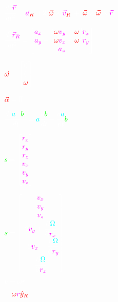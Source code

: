 \documentclass{article}
\begin{document}
\begin{center}
{%
$
\color{white}\cfrac{d^2\color{magenta}\vec{r}}{dt^2}=
\color{magenta}\vec{a}_{\color{red}R}$ $\color{white}+2$ $
\color{red}\vec{\omega}\color{white}\times\color{magenta}\vec{v}_{\color{red}R}$ $\color{white}+$ $
\color{red}\vec{\omega}\color{white}\times\color{red}\vec{\omega}\color{white}\times\color{magenta}\vec{r}
$

$
\color{white}\cfrac{d^2\color{magenta}\vec{r}_R}{dt^2}=
\begin{bmatrix}
	\color{magenta}a_x\color{white}-2\color{red}\omega\color{magenta}v_y\color{white}-\color{red}\omega^{\color{white}2}\color{magenta}r_x \\
	\color{magenta}a_y\color{white}-2\color{red}\omega\color{magenta}v_x\color{white}-\color{red}\omega^{\color{white}2}\color{magenta}r_y \\
	\color{magenta}a_z
\end{bmatrix}
$

$
\color{red}\vec{\omega}\color{white}=
\begin{bmatrix}
	0 \\ 0 \\ \color{red}\omega
\end{bmatrix}
$

$
\color{red}\vec{\alpha}\color{white}=\vec{0}
$


$
\color{white}\cfrac{d(\color{cyan}a\color{white}\cdot\color{green}b\color{white})}{dt}=
\color{cyan}a\color{white}\cfrac{d\color{green}b\color{white}}{dt}+
\cfrac{d\color{cyan}a\color{white}}{dt}\color{green}b
$


$
\color{white}\underline{\color{green}s\color{white}}=
\begin{bmatrix}
	 \color{magenta}r_x \\
	 \color{magenta}r_y \\
	 \color{magenta}r_z \\
	 \color{magenta}v_x \\
	 \color{magenta}v_y \\
	 \color{magenta}v_z
\end{bmatrix}
$

$
\color{white}\dot{\underline{\color{green}s\color{white}}}=
\begin{bmatrix}
	 \color{magenta}v_x \\
	 \color{magenta}v_y \\
	 \color{magenta}v_z \\
	 \color{white}2\color{magenta}v_y\color{white}+\cfrac{\partial\color{cyan}\Omega}{\partial \color{magenta}r_x} \\
	 \color{white}-2\color{magenta}v_x\color{white}+\cfrac{\partial\color{cyan}\Omega}{\partial \color{magenta}r_y} \\
	 \color{white}\cfrac{\partial\color{cyan}\Omega}{\partial \color{magenta}r_z}
\end{bmatrix}
$


$
\color{white}v=\omega r
$

$
\color{white}=\color{red}\omega\color{magenta}r\color{red}\hat{y}_R
$


}\end{center}
\end{document}
